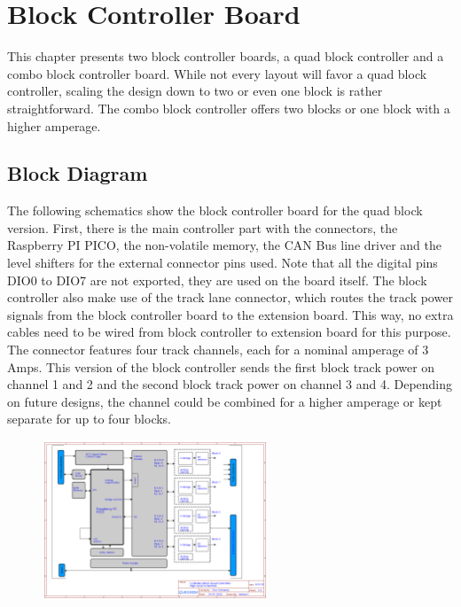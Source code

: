 \chapter{Block Controller Board}

This chapter presents two block controller boards, a quad block controller and a combo block controller board. While not every layout will favor a quad block controller, scaling the design down to two or even one block is rather straightforward. The combo block controller offers two blocks or one block with a higher amperage. 

\section{Block Diagram}

The following schematics show the block controller board for the quad block version. First, there is the main controller part with the connectors, the Raspberry PI PICO, the non-volatile memory, the CAN Bus line driver and the level shifters for the external connector pins used. Note that all the digital pins DIO0 to DIO7 are not exported, they are used on the board itself. The block controller also make use of the track lane connector, which routes the track power signals from the block controller board to the extension board. This way, no extra cables need to be wired from block controller to extension board for this purpose. The connector features four track channels, each for a nominal amperage of 3 Amps. This version of the block controller sends the first block track power on channel 1 and 2 and the second block track power on channel 3 and 4. Depending on future designs, the channel could be combined for a higher amperage or kept separate for up to four blocks.

\begin{figure}[htbp]
    \centering
    \includegraphics[page=1, width=0.6\textwidth]{./Schematics/Schematic_LcsNodes-Block-Quad-Controller.pdf}
\end{figure}
\FloatBarrier

